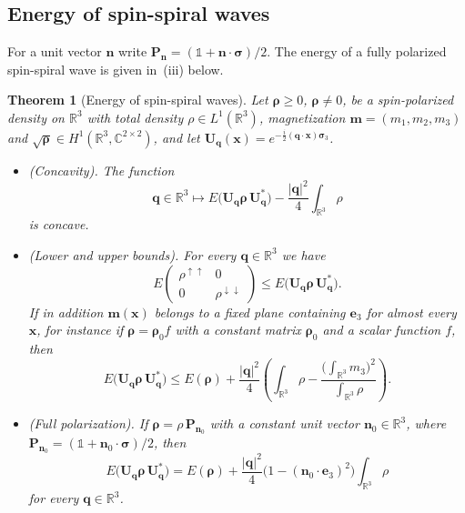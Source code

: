 \documentclass[final,reqno]{amsart}
\newtheorem{theorem}{Theorem}[section]
\theoremstyle{remark}
\renewcommand{\le}{\leqslant}
\renewcommand{\ge}{\geqslant}
\newcommand{\spu}{\uparrow}
\newcommand{\spd}{\downarrow}
\newcommand{\RR}{\mathbb{R}}
\newcommand{\CC}{\mathbb{C}}
\newcommand{\iden}{\mathbb{1}}
\begin{document}
\subsection{Energy of spin-spiral waves}\label{sec:proof_spirals}
For a unit vector $\mathbf{n}$ write $\mathbf{P}_{\mathbf{n}}=(\iden+\mathbf{n}\cdot\bm{\sigma})/2$. The energy of a fully polarized spin-spiral wave is given in~(iii) below.

\begin{theorem}[Energy of spin-spiral waves]\label{thm:spirals}
Let $\bm{\rho}\ge0$, $\bm{\rho}\neq0$, be a spin-polarized density on $\RR^3$ with total density $\rho\in L^1(\RR^3)$, magnetization $\mathbf{m}=(m_1,m_2,m_3)$ and $\sqrt{\bm{\rho}}\in H^1(\RR^3,\CC^{2\times2})$, and let $\mathbf{U}_{\mathbf{q}}(\mathbf{x})=e^{-\frac{i}2(\mathbf{q}\cdot\mathbf{x})\bm{\sigma}_3}$.
\begin{itemize}
\item[(i)] \emph{(Concavity)}. The function
$$
\mathbf{q}\in\RR^3\mapsto E\big(\mathbf{U}_{\mathbf{q}}\bm{\rho}\,\mathbf{U}_{\mathbf{q}}^*\big)-\frac{|\mathbf{q}|^2}{4}\int_{\RR^3}\rho
$$
is concave.
\item[(ii)] \emph{(Lower and upper bounds)}. For every $\mathbf{q}\in\RR^3$ we have
\begin{equation}\label{eq:spiral_lower}
E\begin{pmatrix}\rho^{\spu\spu}&0\\0&\rho^{\spd\spd}\end{pmatrix}\le E\big(\mathbf{U}_{\mathbf{q}}\bm{\rho}\,\mathbf{U}_{\mathbf{q}}^*\big).
\end{equation}
If in addition $\mathbf{m}(\mathbf{x})$ belongs to a fixed plane containing $\mathbf{e}_3$ for almost every $\mathbf{x}$, for instance if $\bm{\rho}=\bm{\rho}_0f$ with a constant matrix $\bm{\rho}_0$ and a scalar function $f$, then
\begin{equation}\label{eq:spiral_upper}
E\big(\mathbf{U}_{\mathbf{q}}\bm{\rho}\,\mathbf{U}_{\mathbf{q}}^*\big)\le E(\bm{\rho})+\frac{|\mathbf{q}|^2}{4}\left(\int_{\RR^3}\rho-\frac{\big(\int_{\RR^3}m_3\big)^2}{\int_{\RR^3}\rho}\right).
\end{equation}
\item[(iii)] \emph{(Full polarization)}. If $\bm{\rho}=\rho\,\mathbf{P}_{\mathbf{n}_0}$ with a constant unit vector $\mathbf{n}_0\in\RR^3$, where $\mathbf{P}_{\mathbf{n}_0}=(\iden+\mathbf{n}_0\cdot\bm{\sigma})/2$, then
\begin{equation}\label{eq:spiral_exact}
E\big(\mathbf{U}_{\mathbf{q}}\bm{\rho}\,\mathbf{U}_{\mathbf{q}}^*\big)= E(\bm{\rho})+\frac{|\mathbf{q}|^2}{4}\Big(1-(\mathbf{n}_0\cdot\mathbf{e}_3)^2\Big)\int_{\RR^3}\rho
\end{equation}
for every $\mathbf{q}\in\RR^3$.
\end{itemize}
\end{theorem}
\end{document}
